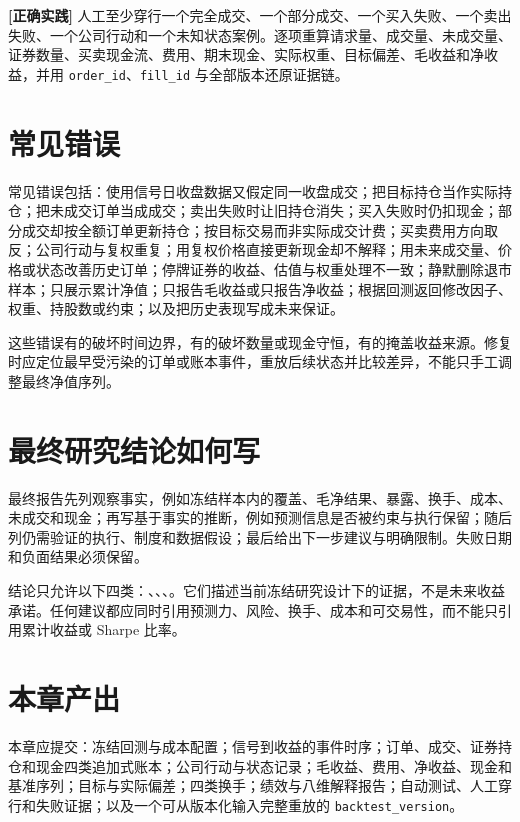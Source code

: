 \begin{practicebox}
\textbf{[正确实践]} 人工至少穿行一个完全成交、一个部分成交、一个买入失败、一个卖出失败、一个公司行动和一个未知状态案例。逐项重算请求量、成交量、未成交量、证券数量、买卖现金流、费用、期末现金、实际权重、目标偏差、毛收益和净收益，并用 \texttt{order\_id}、\texttt{fill\_id} 与全部版本还原证据链。
\end{practicebox}

\section{常见错误}

\begin{warningbox}
常见错误包括：使用信号日收盘数据又假定同一收盘成交；把目标持仓当作实际持仓；把未成交订单当成成交；卖出失败时让旧持仓消失；买入失败时仍扣现金；部分成交却按全额订单更新持仓；按目标交易而非实际成交计费；买卖费用方向取反；公司行动与复权重复；用复权价格直接更新现金却不解释；用未来成交量、价格或状态改善历史订单；停牌证券的收益、估值与权重处理不一致；静默删除退市样本；只展示累计净值；只报告毛收益或只报告净收益；根据回测返回修改因子、权重、持股数或约束；以及把历史表现写成未来保证。
\end{warningbox}

这些错误有的破坏时间边界，有的破坏数量或现金守恒，有的掩盖收益来源。修复时应定位最早受污染的订单或账本事件，重放后续状态并比较差异，不能只手工调整最终净值序列。

\section{最终研究结论如何写}

最终报告先列观察事实，例如冻结样本内的覆盖、毛净结果、暴露、换手、成本、未成交和现金；再写基于事实的推断，例如预测信息是否被约束与执行保留；随后列仍需验证的执行、制度和数据假设；最后给出下一步建议与明确限制。失败日期和负面结果必须保留。

结论只允许以下四类：、、、。它们描述当前冻结研究设计下的证据，不是未来收益承诺。任何建议都应同时引用预测力、风险、换手、成本和可交易性，而不能只引用累计收益或 Sharpe 比率。

\section{本章产出}

\begin{outputbox}
本章应提交：冻结回测与成本配置；信号到收益的事件时序；订单、成交、证券持仓和现金四类追加式账本；公司行动与状态记录；毛收益、费用、净收益、现金和基准序列；目标与实际偏差；四类换手；绩效与八维解释报告；自动测试、人工穿行和失败证据；以及一个可从版本化输入完整重放的 \texttt{backtest\_version}。
\end{outputbox}

